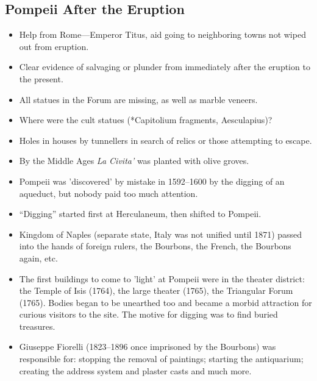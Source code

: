 \documentclass{article}
\begin{document}
\subsection{Pompeii After the Eruption}
\begin{itemize}
\item Help from Rome---Emperor Titus, aid going to neighboring towns not wiped out from eruption.
\item Clear evidence of salvaging or plunder from immediately after the eruption to the present.
\item All statues in the Forum are missing, as well as marble veneers.
\item Where were the cult statues (*Capitolium fragments, Aesculapius)?
\item Holes in houses by tunnellers in search of relics or those attempting to escape.
\item By the Middle Ages \textit{La Civita'} was planted with olive groves.
\item Pompeii was 'discovered' by mistake in 1592--1600 by the digging of an aqueduct, but nobody paid too much attention.
\item ``Digging'' started first at Herculaneum, then shifted to Pompeii.
\item Kingdom of Naples (separate state, Italy was not unified until 1871) passed into the hands of foreign rulers, the Bourbons, the French, the Bourbons again, etc.
\item The first buildings to come to 'light' at Pompeii were in the theater district: the Temple of Isis (1764), the large theater (1765), the Triangular Forum (1765).  Bodies began to be unearthed too and became a morbid attraction for curious visitors to the site.  The motive for digging was to find buried treasures.
\item Giuseppe Fiorelli (1823--1896 once imprisoned by the Bourbons) was responsible for: stopping the removal of paintings; starting the antiquarium; creating the address system and plaster casts and much more.
\end{itemize}
\end{document}
